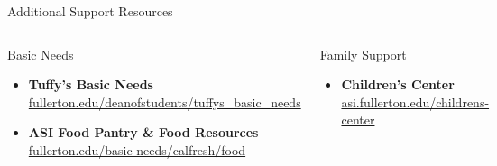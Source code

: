 \documentclass[10pt]{beamer}
\begin{document}
\begin{frame}{Additional Support Resources}
\begin{columns}[T,onlytextwidth]
  \begin{block}{Basic Needs}
    \begin{itemize}\setlength{\itemsep}{4pt}
      \item \textbf{Tuffy's Basic Needs}\\[-2pt]
        \footnotesize\href{https://www.fullerton.edu/deanofstudents/tuffys_basic_needs}{fullerton.edu/deanofstudents/tuffys\_basic\_needs}
      \item \textbf{ASI Food Pantry \& Food Resources}\\[-2pt]
        \footnotesize\href{https://www.fullerton.edu/basic-needs/calfresh/food.html}{fullerton.edu/basic-needs/calfresh/food}
    \end{itemize}
  \end{block}

  \begin{block}{Family Support}
    \begin{itemize}\setlength{\itemsep}{4pt}
      \item \textbf{Children's Center}\\[-2pt]
        \footnotesize\href{https://asi.fullerton.edu/childrens-center}{asi.fullerton.edu/childrens-center}
    \end{itemize}
  \end{block}
\end{columns}
\end{frame}
\end{document}
